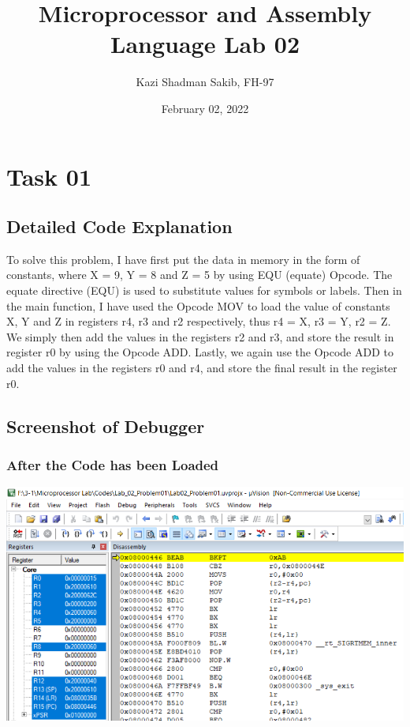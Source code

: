 \documentclass{article}
\title{Microprocessor and Assembly Language Lab 02}
\author{Kazi Shadman Sakib, FH-97}
\date{February 02, 2022}
\begin{document}
\maketitle

\section{Task 01}

\subsection{Detailed Code Explanation}

To solve this problem, I have first put the data in memory in the form of constants, where X = 9, Y = 8 and Z = 5 by using EQU (equate) Opcode. The equate directive (EQU) is used to substitute values for symbols or labels. Then in the main function, I have used the Opcode MOV to load the value of constants X, Y and Z in registers r4, r3 and r2 respectively, thus r4 = X, r3 = Y, r2 = Z. We simply then add the values in the registers r2 and r3, and store the result in register r0 by using the Opcode ADD. Lastly, we again use the Opcode ADD to add the values in the registers r0 and r4, and store the final result in the register r0.

\subsection{Screenshot of Debugger}

\subsubsection{After the Code has been Loaded}
\begin{center}
    \includegraphics[width=1.1\textwidth]{problem01_01.png}
\end{center}
\end{document}
